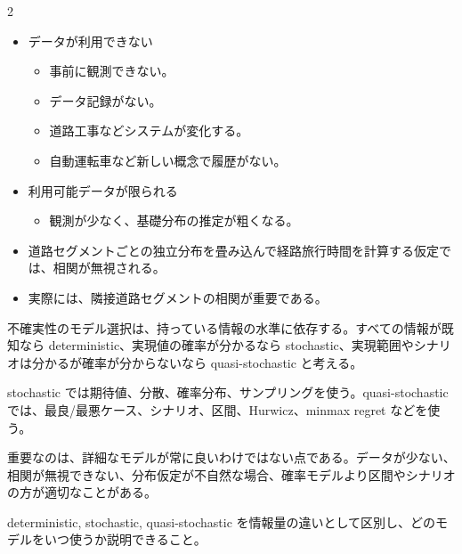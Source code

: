 \begin{multicols}{2}

\footnotesize

\raggedcolumns


\begin{itemize}
\item データが利用できない
\begin{itemize}
\item 事前に観測できない。
\item データ記録がない。
\item 道路工事などシステムが変化する。
\item 自動運転車など新しい概念で履歴がない。
\end{itemize}
\item 利用可能データが限られる
\begin{itemize}
\item 観測が少なく、基礎分布の推定が粗くなる。
\end{itemize}
\item 道路セグメントごとの独立分布を畳み込んで経路旅行時間を計算する仮定では、相関が無視される。
\item 実際には、隣接道路セグメントの相関が重要である。
\end{itemize}

不確実性のモデル選択は、持っている情報の水準に依存する。すべての情報が既知なら deterministic、実現値の確率が分かるなら stochastic、実現範囲やシナリオは分かるが確率が分からないなら quasi-stochastic と考える。\par

stochastic では期待値、分散、確率分布、サンプリングを使う。quasi-stochastic では、最良/最悪ケース、シナリオ、区間、Hurwicz、minmax regret などを使う。\par

重要なのは、詳細なモデルが常に良いわけではない点である。データが少ない、相関が無視できない、分布仮定が不自然な場合、確率モデルより区間やシナリオの方が適切なことがある。\par

deterministic, stochastic, quasi-stochastic を情報量の違いとして区別し、どのモデルをいつ使うか説明できること。\par


\end{multicols}
